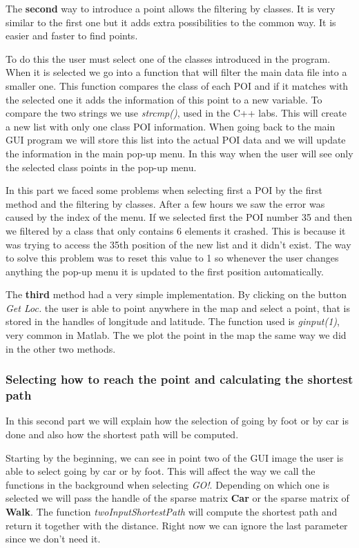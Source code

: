 \documentclass{article}
\begin{document}
The \textbf{second} way to introduce a point allows the filtering by classes. It is very similar to the first one but it adds extra possibilities to the common way. It is easier and faster to find points.

To do this the user must select one of the classes introduced in the program. When it is selected we go into a function that will filter the main data file into a smaller one. This function compares the class of each POI and if it matches with the selected one it adds the information of this point to a new variable. To compare the two strings we use \textit{strcmp()}, used in the C++ labs. This will create a new list with only one class POI information. When going back to the main GUI program we will store this list into the actual POI data and we will update the information in the main pop-up menu. In this way when the user will see only the selected class points in the pop-up menu.

In this part we faced some problems when selecting first a POI by the first method and the filtering by classes. After a few hours we saw the error was caused by the index of the menu. If we selected first the POI number 35 and then we filtered by a class that only contains 6 elements it crashed. This is because it was trying to access the 35th position of the new list and it didn't exist. The way to solve this problem was to reset this value to 1 so whenever the user changes anything the pop-up menu it is updated to the first position automatically.

The \textbf{third} method had a very simple implementation. By clicking on the button \textit{Get Loc.} the user is able to point anywhere in the map and select a point, that is stored in the handles of longitude and latitude. The function used is \textit{ginput(1)}, very common in Matlab. The we plot the point in the map the same way we did in the other two methods.

\subsubsection{Selecting how to reach the point and calculating the shortest path}

In this second part we will explain how the selection of going by foot or by car is done and also how the shortest path will be computed.

Starting by the beginning, we can see in point two of the GUI image the user is able to select going by car or by foot. This will affect the way we call the functions in the background when selecting \textit{GO!}. Depending on which one is selected we will pass the handle of the sparse matrix \textbf{Car} or the sparse matrix of \textbf{Walk}. The function \textit{twoInputShortestPath} will compute the shortest path and return it together with the distance. Right now we can ignore the last parameter since we don't need it.
\end{document}
